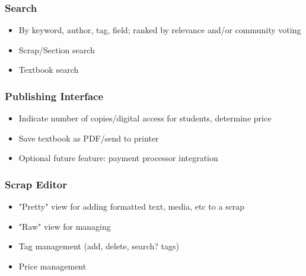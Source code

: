 \documentclass[letterpaper, 10pt, draftclsnofoot, onecolumn]{IEEEtran}
\begin{document}
{{{\subsubsection[System feature 4: Search Feature]{\rmfamily\bfseries\color{black} Search
}
\begin{itemize}
\item By keyword, author, tag, field; ranked by relevance and/or community voting
\item Scrap/Section search
\item Textbook search
\end{itemize}

\subsubsection[System feature 5: Publishing Interface]{\rmfamily\bfseries\color{black} Publishing Interface
}
\begin{itemize}
\item Indicate number of copies/digital access for students, determine price
\item Save textbook as PDF/send to printer
\item Optional future feature: payment processor integration
\end{itemize}

\subsubsection[System feature 6: Scrap Editor]{\rmfamily\bfseries\color{black} Scrap Editor}
\begin{itemize}
\item "Pretty" view for adding formatted text, media, etc to a scrap
\item "Raw" view for managing
\item Tag management (add, delete, search? tags)
\item Price management
\end{itemize}

\bigskip

}}}
\end{document}
